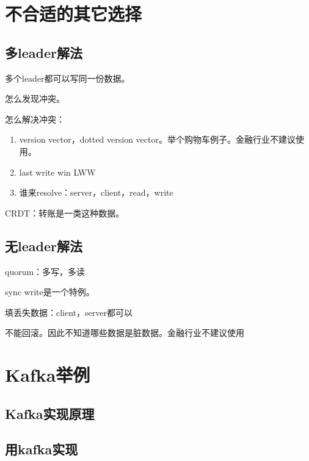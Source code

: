 \section{不合适的其它选择}

\subsection{多leader解法}
多个leader都可以写同一份数据。

怎么发现冲突。

怎么解决冲突：
\begin{enumerate}
    \item version vector，dotted version vector。举个购物车例子。金融行业不建议使用。
    \item last write win LWW
    \item 谁来resolve：server，client，read，write
\end{enumerate}


CRDT：转账是一类这种数据。

\subsection{无leader解法}
quorum：多写，多读

sync write是一个特例。

填丢失数据：client，server都可以

不能回滚。因此不知道哪些数据是脏数据。金融行业不建议使用

\section{Kafka举例}
\subsection{Kafka实现原理}

\subsection{用kafka实现}

